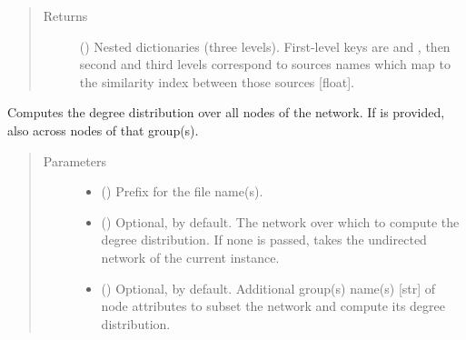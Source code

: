 \documentclass[letterpaper,10pt,english]{sphinxmanual}
\begin{document}
\begin{fulllineitems}
\begin{fulllineitems}
\begin{quote}
\begin{description}
\item[{Returns}] \leavevmode
() \textendash{} Nested dictionaries (three levels). First-level
keys are  and , then second and third
levels correspond to sources names which map to the
similarity index between those sources {[}float{]}.

\end{description}\end{quote}

\end{fulllineitems}


\begin{fulllineitems}
\label{\detokenize{main:pypath.main.PyPath.degree_dist}}
Computes the degree distribution over all nodes of the network.
If  is provided, also across nodes of that group(s).
\begin{quote}\begin{description}
\item[{Parameters}] \leavevmode\begin{itemize}
\item {} 
 () \textendash{} Prefix for the file name(s).

\item {} 
 () \textendash{} Optional,  by default. The network over which to
compute the degree distribution. If none is passed, takes
the undirected network of the current instance.

\item {} 
 () \textendash{} Optional,  by default. Additional group(s) name(s)
{[}str{]} of node attributes to subset the network and compute
its degree distribution.

\end{itemize}

\end{description}\end{quote}


\end{fulllineitems}
\end{fulllineitems}
\end{document}

